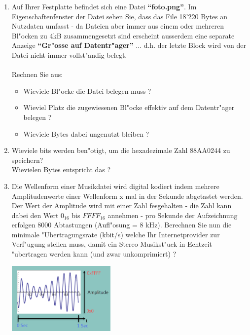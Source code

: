 \documentclass[a4paper,10pt]{article}
\begin{document}
\begin{enumerate}

\item Auf Ihrer Festplatte befindet sich eine Datei \textbf{``foto.png''}. Im Eigenschaftenfenster der Datei sehen Sie, dass das File 18'220 Bytes an Nutzdaten umfasst - da Dateien aber immer aus einem oder mehreren Bl"ocken zu 4kB zusammengesetzt sind erscheint ausserdem eine separate Anzeige \textbf{``Gr"osse auf Datentr"ager''} ... d.h. der letzte Block wird von der Datei nicht immer vollst"andig belegt. \\
\\
Rechnen Sie aus:
\begin{itemize}
\item Wieviele Bl"ocke die Datei belegen muss ?
\item Wieviel Platz die zugewiesenen Bl"ocke effektiv auf dem Datentr"ager belegen ?
\item Wieviele Bytes dabei ungenutzt bleiben ?
\end{itemize}

\item Wieviele bits werden ben"otigt, um die hexadezimale Zahl 88AA0244 zu speichern? \\
Wievielen Bytes entspricht das ? %

\item Die Wellenform einer Musikdatei wird digital kodiert indem mehrere Amplitudenwerte einer Wellenform x mal in der Sekunde abgetastet werden. Der Wert der Amplitude wird mit einer Zahl fesgehalten - die Zahl kann dabei den Wert $0_{16}$ bis $FFFF_{16}$ annehmen - pro Sekunde der Aufzeichnung erfolgen 8000 Abtastungen (Aufl"osung = 8 kHz). Berechnen Sie nun die minimale "Ubertragungsrate (kbit/s) welche Ihr Internetprovider zur Verf"ugung stellen muss, damit ein Stereo Musikst"uck in Echtzeit "ubertragen werden kann (und zwar unkomprimiert) ? %

\vspace{3mm}

\begin{center}
\includegraphics[width=150pt]{Wave.png}
\end{center}

\end{enumerate}
\end{document}
